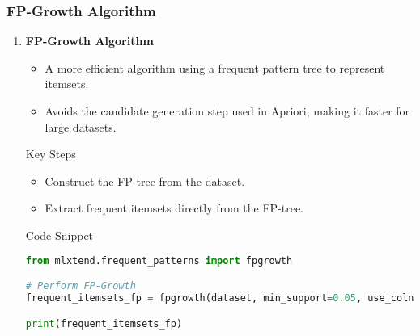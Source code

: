 \documentclass[aspectratio=169]{beamer}
\begin{document}
\begin{frame}[fragile]
    \frametitle{FP-Growth Algorithm}
    \begin{enumerate}
        \item \textbf{FP-Growth Algorithm}
        \begin{itemize}
            \item A more efficient algorithm using a frequent pattern tree to represent itemsets.
            \item Avoids the candidate generation step used in Apriori, making it faster for large datasets.
        \end{itemize}

        \begin{block}{Key Steps}
            \begin{itemize}
                \item Construct the FP-tree from the dataset.
                \item Extract frequent itemsets directly from the FP-tree.
            \end{itemize}
        \end{block}
        
        \begin{block}{Code Snippet}
            \begin{lstlisting}[language=Python]
from mlxtend.frequent_patterns import fpgrowth

# Perform FP-Growth
frequent_itemsets_fp = fpgrowth(dataset, min_support=0.05, use_colnames=True)

print(frequent_itemsets_fp)
            \end{lstlisting}
        \end{block}
    \end{enumerate}
\end{frame}
\end{document}
